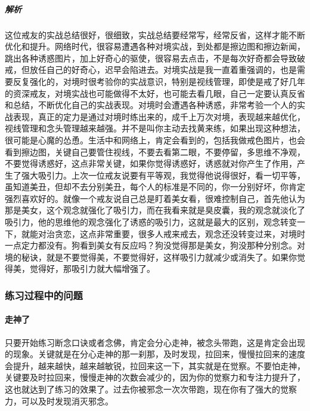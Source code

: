 \begin{case}[实战水平提升的过程]
    \subparagraph{解析} 这位戒友的实战总结很好，很细致，实战总结要经常写，经常反省，这样才能不断优化和提升。网络时代，很容易遭遇各种对境实战，到处都是擦边图和擦边新闻，跳出各种诱惑图片，加上好奇心的驱使，很容易去点击，不是每次好奇都会导致破戒，但放任自己的好奇心，迟早会陷进去。对境实战是我一直着重强调的，也是需要反复强化的，对境时很考验你的实战意识，特别是视线管理，即使是戒了好几年的资深戒友，对境实战也可能做得不太好，也可能去看几眼，自己一定要认真反省和总结，不断优化自己的实战表现。对境时会遭遇各种诱惑，非常考验一个人的实战表现，真正的定力是通过对境时练出来的，成千上万次对境，表现越来越优化，视线管理和念头管理越来越强。并不是叫你主动去找黄来练，如果出现这种想法，很可能是心魔的怂恿。生活中和网络上，肯定会看到的，包括我做戒色图片，也会看到擦边图，关键自己要管住视线，不要去看第二眼，不要停留，多思维不净观，不要觉得诱惑好，这点非常关键，如果你觉得诱惑好，诱惑就对你产生了作用，产生了强大吸引力。上次一位戒友说要有平等观，我觉得他说得很好，看一切平等，虽知道美丑，但却不去分别美丑，每个人的标准是不同的，你一分别好坏，你肯定强烈喜欢好的。就像一个戒友说自己总是盯着美女看，很难控制自己，首先他认为那是美女，这个观念就强化了吸引力，而在我看来就是臭皮囊，我的观念就淡化了吸引力，他的思维他的观念强化了诱惑的吸引力，这就是最大的区别，观念转变一下，就能对治贪恋，这点非常重要，很多人戒来戒去，观念还没转变过来，对境时一点定力都没有。狗看到美女有反应吗？狗没觉得那是美女，狗没那种分别念。对境的秘诀，就是不要觉得美，不要觉得好，这样吸引力就减少或消失了。如果你觉得美，觉得好，那吸引力就大幅增强了。
\end{case}

\subsubsection{练习过程中的问题}

\paragraph{走神了}

只要开始练习断念口诀或者念佛，肯定会分心走神，被念头带跑，这是肯定会出现的现象。关键就是在分心走神的那一刹那，及时发现，拉回来，慢慢拉回来的速度会提升，越来越快，越来越敏锐，拉回来这一下，其实就是在觉察。不要怕走神，关键要及时拉回来，慢慢走神的次数会减少的，因为你的觉察力和专注力提升了，这也就达到了练习的效果了。过去你被邪念一次次带跑，现在你有了强大的觉察力，可以及时发现消灭邪念。

